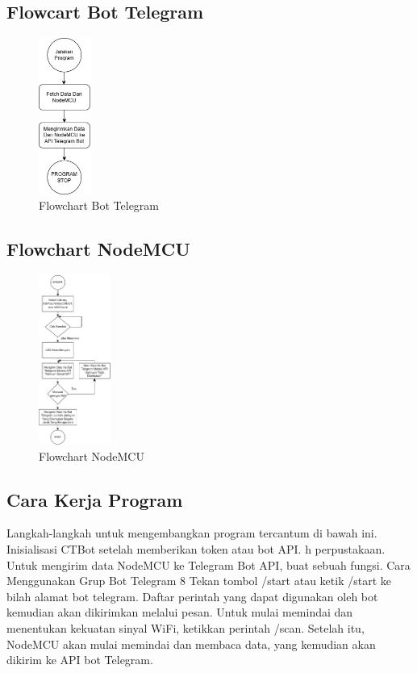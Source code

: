 \documentclass[conference]{IEEEtran}
\begin{document}
\subsection{Flowcart Bot Telegram}
\begin{figure}[h]
    \centering
    \includegraphics[width=0.15\textwidth]{telegrambot.png}
    \caption{Flowchart Bot Telegram}
\end{figure}

\subsection{Flowchart NodeMCU}
\begin{figure}[h]
    \centering
    \includegraphics[width=0.21\textwidth]{telegrambot.drawio.png}
    \caption{Flowchart NodeMCU}
\end{figure}
\vspace{1cm}
\subsection{Cara Kerja Program}
Langkah-langkah untuk mengembangkan program tercantum di bawah ini. Inisialisasi CTBot setelah memberikan token atau bot API. h perpustakaan. Untuk mengirim data NodeMCU ke Telegram Bot API, buat sebuah fungsi.
Cara Menggunakan Grup Bot Telegram 8 Tekan tombol /start atau ketik /start ke bilah alamat bot telegram. Daftar perintah yang dapat digunakan oleh bot kemudian akan dikirimkan melalui pesan.
Untuk mulai memindai dan menentukan kekuatan sinyal WiFi, ketikkan perintah /scan.
Setelah itu, NodeMCU akan mulai memindai dan membaca data, yang kemudian akan dikirim ke API bot Telegram.
\end{document}
